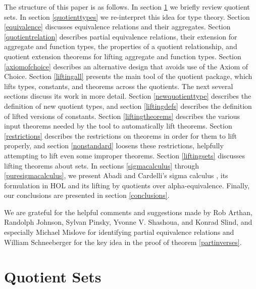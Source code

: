 \documentclass[envcountsame,runningheads]{llncs}
\newcommand{\quotient}{partial equivalence}
\begin{document}
The structure of this paper is as follows.  In section \ref{quotientsets}
we briefly review quotient sets.  In section \ref{quotienttypes} we
re-interpret this idea for type theory.
Section \ref{equivalence} discusses equivalence relations and their
aggregates.
Section \ref{quotientrelation} describes \quotient{} relations,
their extension for aggregate and function types,
the properties of a quotient relationship,
and quotient extension theorems
for lifting aggregate and function types.
Section \ref{axiomofchoice} describes an alternative design
that avoids use of the Axiom of Choice.
Section \ref{liftingall} presents
the main tool of the quotient package, which lifts types, constants,
and theorems across the quotients.
The next several sections discuss
its work
in more detail.
Section \ref{newquotienttype}
describes the definition of new quotient types, and
section \ref{liftingdefs} describes the definition of lifted versions
of constants.
Section \ref{liftingtheorems} describes the various input theorems needed by
the tool to automatically lift theorems.
Section \ref{restrictions} describes the restrictions on theorems
in order for them to lift properly, and section
\ref{nonstandard} loosens these restrictions,
helpfully attempting to lift even some improper theorems.
Section \ref{liftingsets} discusses lifting theorems about sets.
In sections \ref{sigmacalculus} through
\ref{puresigmacalculus}, we present Abadi and Cardelli's sigma calculus
\cite{AbCa96},
its formulation in HOL and its lifting by quotients over alpha-equivalence.
Finally, our conclusions are presented in section \ref{conclusions}.

We are grateful for the helpful comments and
suggestions made by
Rob Arthan,
Randolph Johnson,
Sylvan Pinsky,
Yvonne V. Shashoua,
and
Konrad Slind,
and especially Michael Mislove for identifying
partial equivalence relations and
William Schneeberger for the key idea in the proof of theorem
\ref{partinverses}.


%
\section{Quotient Sets}
%
\label{quotientsets}
\end{document}
